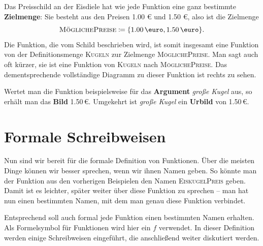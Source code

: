 \documentclass[../../main.tex]{subfiles}
\begin{document}
\begin{example}{}
    Das Preisschild an der Eisdiele hat wie jede Funktion eine ganz bestimmte \textbf{Zielmenge}: Sie besteht aus den Preisen 1.00 \euro{} und 1.50 \euro, also ist die Zielmenge \[\textsc{MöglichePreise}\coloneqq\{\text{1.00\,\euro},\text{1.50\,\euro}\}.\]
    Die Funktion, die vom Schild beschrieben wird, ist somit insgesamt eine Funktion von der Definitionsmenge \textsc{Kugeln} zur Zielmenge \textsc{MöglichePreise}. Man sagt auch oft kürzer, sie ist eine Funktion von \textsc{Kugeln} nach \textsc{MöglichePreise}. Das dementsprechende vollständige Diagramm zu dieser Funktion ist rechts zu sehen.
    
    Wertet man die Funktion beispielsweise für das \textbf{Argument} \emph{große Kugel} aus, so erhält man das \textbf{Bild} 1.50\,\euro. Umgekehrt ist \emph{große Kugel} ein \textbf{Urbild} von 1.50\,\euro.
\end{example}


\section*{Formale Schreibweisen}
\label{sec:abbildungen_definition}
Nun sind wir bereit für die formale Definition von Funktionen. Über die meisten Dinge können wir besser sprechen, wenn wir ihnen Namen geben. So könnte man der Funktion aus den vorherigen Beispielen den Namen \textsc{EiskugelPreis} geben. Damit ist es leichter, später weiter über diese Funktion zu sprechen -- man hat nun einen bestimmten Namen, mit dem man genau diese Funktion verbindet.

Entsprechend soll auch formal jede Funktion einen bestimmten Namen erhalten. Als Formelsymbol für Funktionen wird hier ein $f$ verwendet. In dieser Definition werden einige Schreibweisen eingeführt, die anschließend weiter diskutiert werden.
\end{document}
